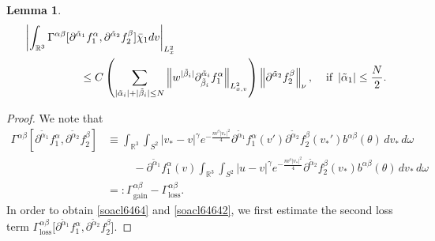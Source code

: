 \documentclass[reqno]{amsart}
\numberwithin{equation}{section}
\newtheorem{lemma}[theorem]{Lemma}
\numberwithin{equation}{section}
\begin{document}
\begin{lemma}
\begin{align}
			&\left| \int_{\mathbb{R}^3} \Gamma^{\alpha \beta} [\partial^{\tilde{\alpha}_1}f^{\alpha}_1, \partial^{\tilde{\alpha}_2}f^{\beta}_2]\bar{\chi}_1 dv \right|_{L^{2}_{x}}\notag\\
			&\hspace{1.8cm} \leq C \left( \sum_{| \tilde{\alpha}_i |+| \tilde{\beta}_i | \le N} \left\| w^{| \tilde{\beta}_i |} \partial_{\tilde{\beta}_i}^{\tilde{\alpha}_i} f^{\alpha}_1\right\|_{L^{2}_{x,v}} \right) \left\| \partial^{\tilde{\alpha}_2}f^{\beta}_2 \right\|_{\nu},\hspace{0.4cm} \text{if}\ \left| \tilde{\alpha}_1 \right| \leq \frac{N}{2}.\label{soacl65652}
		\end{align}
	\end{lemma}	
	
	\begin{proof}
		We note that
		\begin{align*}
			\Gamma^{\alpha \beta} [\partial^{\tilde{\alpha}_1}f^{\alpha}_1, \partial^{\tilde{\alpha}_2}f^{\beta}_2]	&\equiv \int_{\mathbb{R}^3} \int_{S^2} |v_* - v|^\gamma 
			 e^{-\frac{m^{\beta}|v_*|^2}{4}}
			\partial^{\tilde{\alpha}_1}f^{\alpha}_1 (v') \partial^{\tilde{\alpha}_2}f^{\beta}_2 (v_*') 
			b^{\alpha\beta}(\theta) \, dv_* \, d\omega\\
			&\hspace{1cm} - \partial^{\tilde{\alpha}_1}f^{\alpha}_1(v) 
			\int_{\mathbb{R}^3} \int_{S^2} |u - v|^\gamma 
			e^{-\frac{m^{\beta}|v_*|^2}{4}}
			\partial^{\tilde{\alpha}_2}f^{\beta}_2 (v_*)
			b^{\alpha\beta}(\theta) \, dv_* \, d\omega \\
			&=: \Gamma_{\text{gain}}^{\alpha \beta} - \Gamma_{\text{loss}}^{\alpha \beta}.
		\end{align*}
		In order to obtain \eqref{soacl6464} and \eqref{soacl64642}, we first estimate the second loss term $ \Gamma_{\text{loss}}^{\alpha \beta} \big[\partial^{\tilde{\alpha}_1}f^{\alpha}_1, \partial^{\tilde{\alpha}_2}f^{\beta}_2\big] $.
		

\end{proof}
\end{document}
